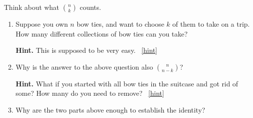 \documentclass{book}
\begin{document}
\setcounter{project}{74}
\addtocounter{project}{-1}
\begin{activity}[]\label{act-pascalsym-dc}
\hypertarget{p-573}{}%
Think about what \(\binom{n}{k}\) counts.%
\begin{enumerate}[font=\bfseries,label=(\alph*),ref=\alph*]
\item\label{task-104} \hypertarget{p-574}{}%
Suppose you own \(n\) bow ties, and want to choose \(k\) of them to take on a trip.  How many different collections of bow ties can you take?%
\par\smallskip%
\noindent\textbf{Hint.}\hypertarget{hint-29}{}\quad%
\hypertarget{p-575}{}%
This is supposed to be very easy.%
~\hfill{\tiny\hyperlink{a-74.a}{[hint]}\hypertarget{q-74.a}{}}\item\label{task-105} \hypertarget{p-576}{}%
Why is the answer to the above question also \(\binom{n}{n-k}\)?%
\par\smallskip%
\noindent\textbf{Hint.}\hypertarget{hint-30}{}\quad%
\hypertarget{p-577}{}%
What if you started with all bow ties in the suitcase and got rid of some?  How many do you need to remove?%
~\hfill{\tiny\hyperlink{a-74.b}{[hint]}\hypertarget{q-74.b}{}}\item\label{task-106} \hypertarget{p-578}{}%
Why are the two parts above enough to establish the identity?%
\end{enumerate}
\end{activity}

\clearpage
\end{document}
